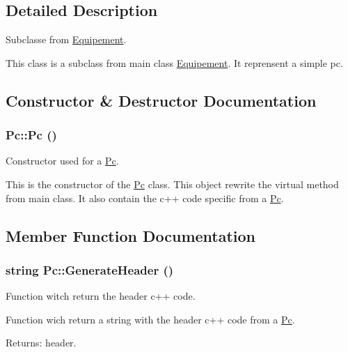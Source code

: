 \subsection{Detailed Description}
Subclasse from \hyperlink{class_equipement}{Equipement}. 

This class is a subclass from main class \hyperlink{class_equipement}{Equipement}. It reprensent a simple pc. 

\subsection{Constructor \& Destructor Documentation}
\hypertarget{class_pc_ef7314496cee3c1bd2c329aac4dc4f21}{
\subsubsection[{Pc}]{\setlength{\rightskip}{0pt plus 5cm}Pc::Pc ()}}
\label{class_pc_ef7314496cee3c1bd2c329aac4dc4f21}


Constructor used for a \hyperlink{class_pc}{Pc}. 

This is the constructor of the \hyperlink{class_pc}{Pc} class. This object rewrite the virtual method from main class. It also contain the c++ code specific from a \hyperlink{class_pc}{Pc}. 

\subsection{Member Function Documentation}
\hypertarget{class_pc_a84eb29bce881921ec8f591dfd5b8ba0}{
\subsubsection[{GenerateHeader}]{\setlength{\rightskip}{0pt plus 5cm}string Pc::GenerateHeader ()}}
\label{class_pc_a84eb29bce881921ec8f591dfd5b8ba0}


Function witch return the header c++ code. 

Function wich return a string with the header c++ code from a \hyperlink{class_pc}{Pc}.

\begin{Desc}
\item[Returns:]header. \end{Desc}


